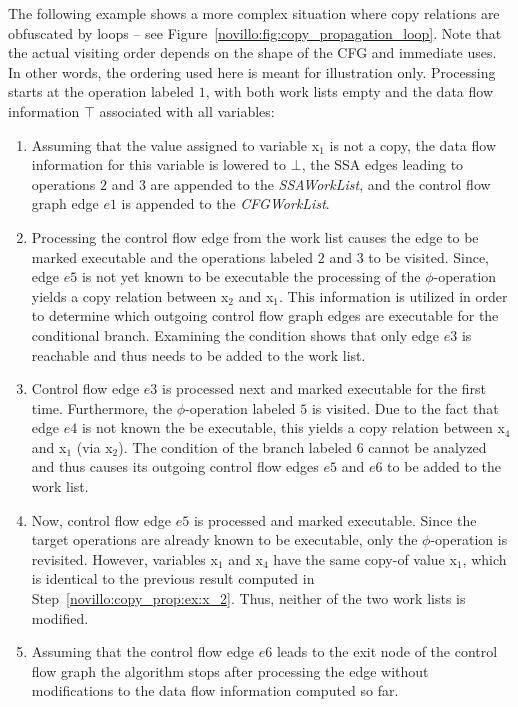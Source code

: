 The following example shows a more complex situation where copy relations are
obfuscated by loops -- see Figure~\ref{novillo:fig:copy_propagation_loop}.  Note
that the actual visiting order depends on the shape of the CFG and immediate
uses. In other words, the ordering used here is meant for illustration only.
Processing starts
at the operation labeled $1$, with both work lists empty and the data flow
information $\top$ associated with all variables:

\begin{enumerate}
\item Assuming that the value assigned to variable x$_1$ is not a copy, the data
      flow information for this variable is lowered to $\bot$, the SSA edges
      leading to operations $2$ and $3$ are appended to the \emph{SSAWorkList},
      and the control flow graph edge $e1$ is appended to the \emph{CFGWorkList}.
\item \label{novillo:copy_prop:ex:x_2} Processing the control flow edge from the
      work list causes the edge to be marked executable and the operations
      labeled $2$ and $3$ to be visited. Since, edge $e5$ is not yet known to be
      executable the processing of the $\phi$-operation yields a copy relation
      between x$_2$ and x$_1$. This information is utilized in order to
      determine which outgoing control flow graph edges are executable for the
      conditional branch. Examining the condition shows that only edge $e3$ is
      reachable and thus needs to be added to the work list.
\item Control flow edge $e3$ is processed next and marked executable for the
      first time.
      Furthermore, the $\phi$-operation labeled $5$ is visited. Due to the fact
      that edge $e4$ is not known the be executable, this yields a
      copy relation between x$_4$ and x$_1$ (via x$_2$). The condition of the
      branch labeled $6$ cannot be analyzed and thus causes its outgoing control
      flow edges $e5$ and $e6$ to be added to the work list.
\item Now, control flow edge $e5$ is processed and marked executable. Since the
      target
      operations are already known to be executable, only the $\phi$-operation
      is revisited. However, variables x$_1$ and x$_4$ have the same copy-of
      value x$_1$, which is identical to the previous result computed in
      Step~\ref{novillo:copy_prop:ex:x_2}. Thus, neither of the two work lists
      is modified.
\item Assuming that the control flow edge $e6$ leads to the exit node of the
      control flow graph
      the algorithm stops after processing the edge without modifications to
      the data flow information computed so far.
\end{enumerate}

